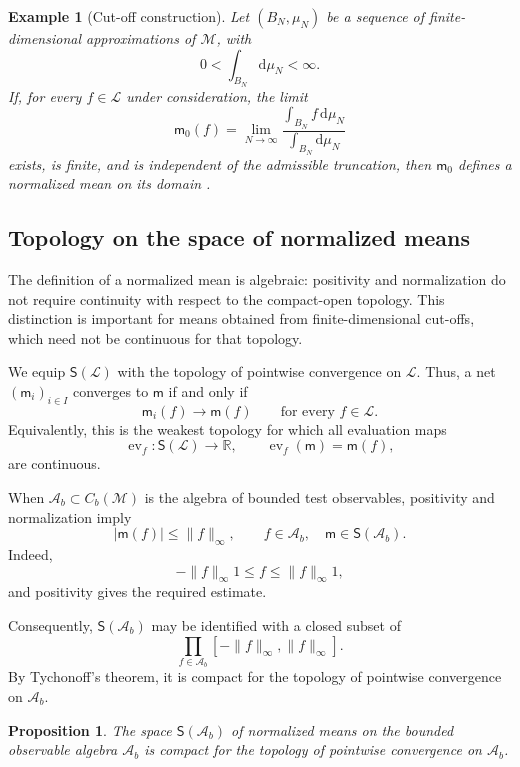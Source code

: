 \documentclass[11pt,reqno]{amsart}
\newtheorem{Proposition}[Theorem]{Proposition}
\newtheorem{example}[Theorem]{Example}
\begin{document}
\begin{example}[Cut-off construction]
\label{ex:cutoff-mean}
Let $(B_N,\mu_N)$ be a sequence of finite-dimensional approximations of
$\mathcal M$, with
\[
0<\int_{B_N}\mathrm d\mu_N<\infty.
\]
If, for every $f\in\mathcal L$ under consideration, the limit
\[
\mathsf m_0(f)
=
\lim_{N\to\infty}
\frac{\displaystyle\int_{B_N}f\,\mathrm d\mu_N}
{\displaystyle\int_{B_N}\mathrm d\mu_N}
\]
exists, is finite, and is independent of the admissible truncation, then
$\mathsf m_0$ defines a normalized mean on its domain
\cite{Magnot17}.
\end{example}

\subsection{Topology on the space of normalized means}
\label{subsec:topology-means}

The definition of a normalized mean is algebraic: positivity and
normalization do not require continuity with respect to the compact-open
topology. This distinction is important for means obtained from
finite-dimensional cut-offs, which need not be continuous for that
topology.

We equip $\mathsf S(\mathcal L)$ with the topology of pointwise
convergence on $\mathcal L$. Thus, a net
$(\mathsf m_i)_{i\in I}$ converges to $\mathsf m$ if and only if
\[
\mathsf m_i(f)\longrightarrow\mathsf m(f)
\qquad
\text{for every }f\in\mathcal L.
\]
Equivalently, this is the weakest topology for which all evaluation maps
\[
\operatorname{ev}_f\colon
\mathsf S(\mathcal L)\longrightarrow\mathbb R,
\qquad
\operatorname{ev}_f(\mathsf m)=\mathsf m(f),
\]
are continuous.

When $\mathcal A_b\subset C_b(\mathcal M)$ is the algebra of bounded
test observables, positivity and normalization imply
\[
\left|\mathsf m(f)\right|
\leq
\|f\|_\infty,
\qquad
f\in\mathcal A_b,
\quad
\mathsf m\in\mathsf S(\mathcal A_b).
\]
Indeed,
\[
-\|f\|_\infty 1
\leq
f
\leq
\|f\|_\infty 1,
\]
and positivity gives the required estimate.

Consequently, $\mathsf S(\mathcal A_b)$ may be identified with a closed
subset of
\[
\prod_{f\in\mathcal A_b}
[-\|f\|_\infty,\|f\|_\infty].
\]
By Tychonoff's theorem, it is compact for the topology of pointwise
convergence on $\mathcal A_b$.

\begin{Proposition}
\label{prop:compact-bounded-states}
The space $\mathsf S(\mathcal A_b)$ of normalized means on the bounded
observable algebra $\mathcal A_b$ is compact for the topology of
pointwise convergence on $\mathcal A_b$.
\end{Proposition}
\end{document}
